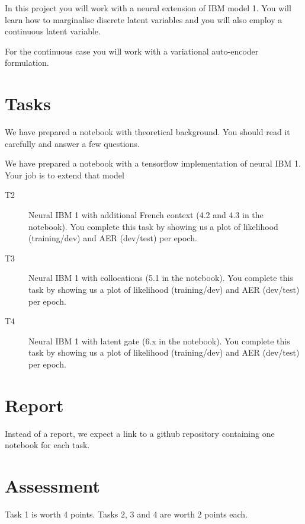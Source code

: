 In this project you will work with a neural extension of IBM model 1. 
You will learn how to marginalise discrete latent variables and you will also employ a continuous latent variable.

For the continuous case you will work with a variational auto-encoder formulation.


\section{Tasks}

\begin{description}
	\item[T1] We have prepared a notebook with theoretical background. You should read it carefully and answer a few questions.
	\item We have prepared a notebook with a tensorflow implementation of neural IBM 1. Your job is to extend that model 
	\begin{description}
		\item[T2] Neural IBM 1 with additional French context (4.2 and 4.3 in the notebook). You complete this task by showing us a plot of likelihood (training/dev) and AER (dev/test) per epoch.
		\item[T3] Neural IBM 1 with collocations (5.1 in the notebook). You complete this task by showing us a plot of likelihood (training/dev) and AER (dev/test) per epoch.
		\item[T4] Neural IBM 1 with latent gate (6.x in the notebook). You complete this task by showing us a plot of likelihood (training/dev) and AER (dev/test) per epoch.
	\end{description}
\end{description}

\section{Report}

Instead of a report, we expect a link to a github repository containing one notebook for each task. 

\section{Assessment}

Task 1 is worth 4 points. Tasks 2, 3 and 4 are worth 2 points each. 